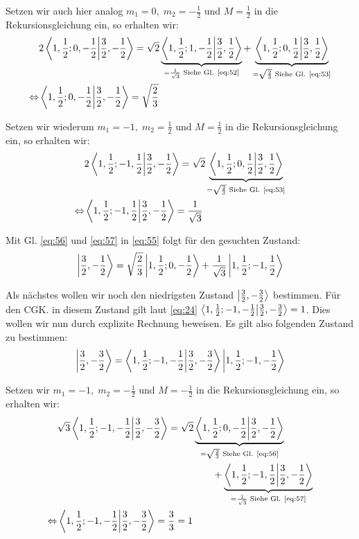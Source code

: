 Setzen wir auch hier analog \(m_1=0,\;m_2=-\frac 1 2\) und \(M=\frac 1 2\) in
die Rekursionsgleichung ein, so erhalten wir:
\begin{align}
  \label{eq:56}
   &2 \braket{1, \frac 1 2; 0, -\frac 1 2}{\frac 3 2,-\frac 1 2}
  = \sqrt 2 \underbrace{
    \braket{1, \frac 1 2; 1, -\frac 1 2}{\frac 3 2,\frac 1 2}}
  _{=\frac 1 {\sqrt 3} \text{ Siehe Gl. \eqref{eq:52}}}
  +\underbrace{
    \braket{1, \frac 1 2; 0, \frac 1 2}{\frac 3 2,\frac 1 2}}
  _{=\sqrt{\frac 2 3} \text{ Siehe Gl. \eqref{eq:53}}}\notag\\
 \Leftrightarrow &\braket{1, \frac 1 2; 0, -\frac 1 2}{\frac 3 2,-\frac 1 2}
 = \sqrt {\frac 2  3} 
\end{align}

Setzen wir wiederum \(m_1=-1,\;m_2=\frac 1 2\) und \(M=\frac 1 2\) in
die Rekursionsgleichung ein, so erhalten wir:
\begin{align}
  \label{eq:57}
   &2 \braket{1, \frac 1 2; -1, \frac 1 2}{\frac 3 2,-\frac 1 2}
  = \sqrt 2 \underbrace{
    \braket{1, \frac 1 2; 0, \frac 1 2}{\frac 3 2,\frac 1 2}}
  _{=\sqrt{\frac 2  3} \text{ Siehe Gl. \eqref{eq:53}}}\notag\\
  \Leftrightarrow &\braket{1, \frac 1 2; -1, \frac 1 2}{\frac 3 2,-\frac 1 2}
 = \frac 1 {\sqrt 3} 
\end{align}

Mit Gl. \eqref{eq:56} und \eqref{eq:57} in \eqref{eq:55} folgt für den gesuchten
Zustand:
\begin{equation}
  \label{eq:58}
   \left| \frac 3 2, -\frac 1 2 \right\rangle=
  \sqrt{\frac 2 3}
  \left| 1, \frac 1 2; 0, -\frac 1 2 \right\rangle
  +\frac 1 {\sqrt 3}
  \left| 1, \frac 1 2; -1, \frac 1 2 \right\rangle
\end{equation}

Als nächstes wollen wir noch den niedrigsten Zustand \(\left| \frac 3 2, -\frac 3
  2 \right\rangle\) bestimmen. Für den CGK. in diesem Zustand gilt laut \eqref{eq:24} \(
 \braket{1,\frac 1 2;-1,-\frac 1 2}{\frac 3 2,-\frac 3 2}=1\). Dies wollen wir
 nun durch explizite Rechnung beweisen. Es gilt also folgenden Zustand zu
 bestimmen:
 \begin{equation}
   \label{eq:59}
   \ket{\frac 3 2, -\frac 3 2}= \braket{1,\frac 1 2;-1,-\frac 1 2}
   {\frac 3 2,-\frac 3 2}\ket{1,\frac 1 2;-1,-\frac 1 2}
 \end{equation}

Setzen wir \(m_1=-1,\;m_2=-\frac 1 2\) und \(M=-\frac 1 2\) in die
Rekursionsgleichung ein, so erhalten wir:
\begin{align}
  \label{eq:60}
     &\sqrt 3 \braket{1, \frac 1 2; -1, -\frac 1 2}{\frac 3 2,-\frac 3 2}
  = \sqrt 2 \underbrace{
    \braket{1, \frac 1 2; 0, -\frac 1 2}{\frac 3 2,-\frac 1 2}}
  _{=\sqrt{\frac 2 3} \text{ Siehe Gl. \eqref{eq:56}}}\notag\\
  &\qquad\qquad\qquad\qquad\qquad\qquad\qquad\qquad+\underbrace{
    \braket{1, \frac 1 2; -1, \frac 1 2}{\frac 3 2,-\frac 1 2}}
  _{=\frac 1 {\sqrt 3} \text{ Siehe Gl. \eqref{eq:57}}}\notag\\
 \Leftrightarrow &\braket{1, \frac 1 2; -1, -\frac 1 2}{\frac 3 2,-\frac 3 2}
 = \frac 3  3 = 1 
\end{align}

